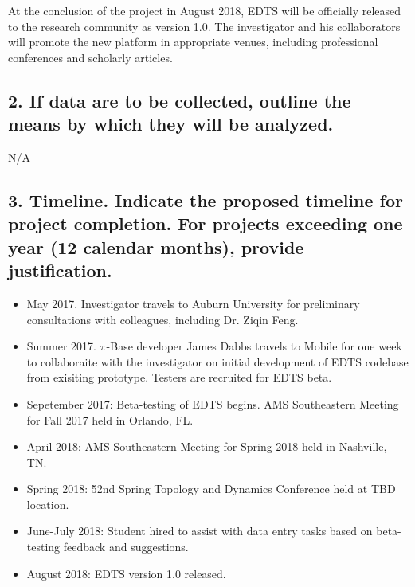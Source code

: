 \documentclass[10pt]{article}
\begin{document}
At the conclusion of the project in August 2018, EDTS will be officially
released to the research community as version 1.0. The investigator and
his collaborators will promote the new platform in appropriate venues,
including professional conferences and scholarly articles.













\subsection*{2. If data are to be collected, outline the means by which they will be analyzed.}

N/A












\subsection*{3. Timeline.  Indicate the proposed timeline for project completion. For projects exceeding one year (12 calendar months), provide justification.}


\begin{itemize}
  \item May 2017. Investigator travels to Auburn University for preliminary
    consultations with colleagues, including Dr. Ziqin Feng.
  \item Summer 2017. \(\pi\)-Base developer James Dabbs travels to Mobile
    for one week to collaboraite with the investigator on initial development
    of EDTS codebase from exisiting prototype. Testers are recruited
    for EDTS beta.
  \item Sepetember 2017: Beta-testing of EDTS begins. AMS Southeastern Meeting
    for Fall 2017 held in Orlando, FL.
  \item April 2018: AMS Southeastern Meeting for Spring 2018 held in Nashville,
    TN.
  \item Spring 2018: 52nd Spring Topology and Dynamics Conference held at TBD
    location.
  \item June-July 2018: Student hired to assist with data entry tasks based on
    beta-testing feedback and suggestions.
  \item August 2018: EDTS version 1.0 released.
\end{itemize}
\end{document}
